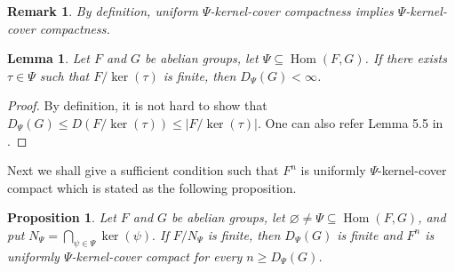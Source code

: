\documentclass[a4paper, 12pt]{article}
\newtheorem{lemma}[theorem]{Lemma}
\newtheorem{prop}[theorem]{Proposition}
\newtheorem{remark}[theorem]{Remark}
\begin{document}
\begin{remark} By definition, uniform $\Psi$-kernel-cover compactness implies
$\Psi$-kernel-cover compactness.
\end{remark}

\begin{lemma}\label{lemma:sometau} Let $F$ and $G$ be abelian groups, let
$\Psi\subseteq\operatorname{Hom}(F,G)$. If there exists $\tau\in \Psi$ such that $F/\ker(\tau)$ is finite, then $D_{\Psi}(G)<\infty$.
\end{lemma}

\begin{proof} By definition, it is not hard to show that $D_{\Psi}(G)\leq D(F/\ker(\tau))\leq |F/\ker(\tau)|$. One can also refer Lemma 5.5 in \cite{WangcommInAlgebra}.
\end{proof}

Next we shall give a sufficient condition such that $F^n$ is uniformly $\Psi$-kernel-cover compact which is stated as the following proposition.

\begin{prop}
\label{prop:finite-effective-quotient}
Let $F$ and $G$ be abelian groups, let
$\varnothing\neq\Psi\subseteq\operatorname{Hom}(F,G)$, and put $N_{\Psi}
=
\bigcap\limits_{\psi\in\Psi}\ker(\psi).$
If $F/N_{\Psi}$ is finite, then $D_{\Psi}(G)$ is finite and $F^n$ is uniformly $\Psi$-kernel-cover compact for every $n\geq D_{\Psi}(G)$.
\end{prop}
\end{document}
